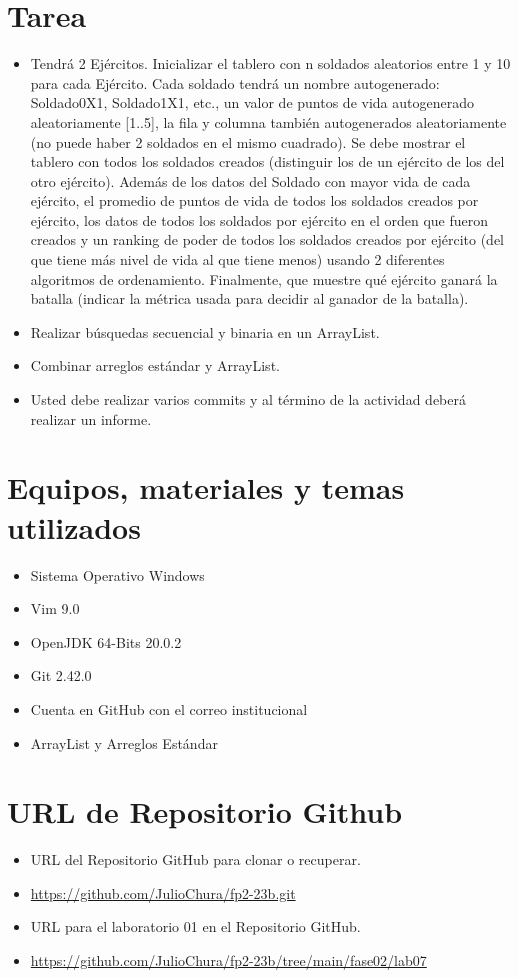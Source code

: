 \documentclass{article}
\begin{document}
	\section{Tarea}
	\begin{itemize}		
		\item 
		Tendrá 2 Ejércitos. Inicializar el tablero con n soldados aleatorios entre 1 y 10 para cada 
		Ejército. Cada soldado tendrá un nombre autogenerado: Soldado0X1, Soldado1X1, etc., un 
		valor de puntos de vida autogenerado aleatoriamente [1..5], la fila y columna también 
		autogenerados aleatoriamente (no puede haber 2 soldados en el mismo cuadrado). Se debe 
		mostrar el tablero con todos los soldados creados (distinguir los de un ejército de los del otro 
		ejército). Además de los datos del Soldado con mayor vida de cada ejército, el promedio de 
		puntos de vida de todos los soldados creados por ejército, los datos de todos los soldados por 
		ejército en el orden que fueron creados y un ranking de poder de todos los soldados creados
		por ejército (del que tiene más nivel de vida al que tiene menos) usando 2 diferentes 
		algoritmos de ordenamiento. Finalmente, que muestre qué ejército ganará la batalla (indicar 
		la métrica usada para decidir al ganador de la batalla).
		\item Realizar búsquedas secuencial y binaria en un ArrayList.
		\item Combinar arreglos estándar y ArrayList.
		\item Usted debe realizar varios commits y al término de la actividad deberá realizar un informe.
		
		
	\end{itemize}
	
	\section{Equipos, materiales y temas utilizados}
	\begin{itemize}
		\item Sistema Operativo Windows
		\item Vim 9.0
		\item OpenJDK 64-Bits 20.0.2
		\item Git 2.42.0
		\item Cuenta en GitHub con el correo institucional
		\item ArrayList y Arreglos Estándar
	\end{itemize}
	
	\section{URL de Repositorio Github}
	\begin{itemize}
		\item URL del Repositorio GitHub para clonar o recuperar.
		\item \url{https://github.com/JulioChura/fp2-23b.git}
		\item URL para el laboratorio 01 en el Repositorio GitHub.
		\item \url{https://github.com/JulioChura/fp2-23b/tree/main/fase02/lab07}
	\end{itemize}
	
\end{document}
